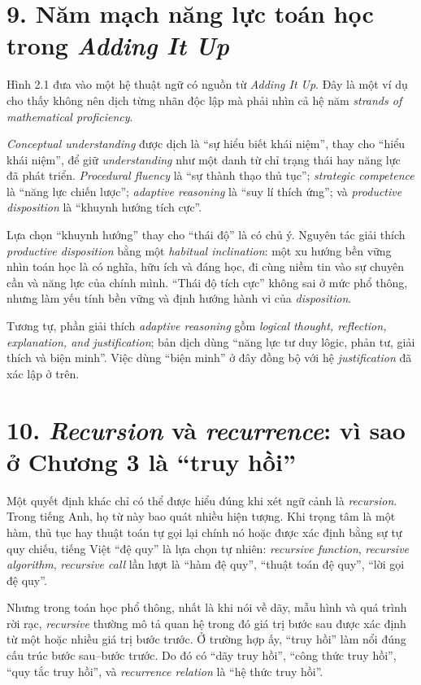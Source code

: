 \section*{9. Năm mạch năng lực toán học trong \emph{Adding It Up}}

Hình 2.1 đưa vào một hệ thuật ngữ có nguồn từ \emph{Adding It Up}. Đây là một ví dụ cho thấy không nên dịch từng nhãn độc lập mà phải nhìn cả hệ năm \emph{strands of mathematical proficiency}.

\emph{Conceptual understanding} được dịch là ``sự hiểu biết khái niệm'', thay cho ``hiểu khái niệm'', để giữ \emph{understanding} như một danh từ chỉ trạng thái hay năng lực đã phát triển. \emph{Procedural fluency} là ``sự thành thạo thủ tục''; \emph{strategic competence} là ``năng lực chiến lược''; \emph{adaptive reasoning} là ``suy lí thích ứng''; và \emph{productive disposition} là ``khuynh hướng tích cực''.

Lựa chọn ``khuynh hướng'' thay cho ``thái độ'' là có chủ ý. Nguyên tác giải thích \emph{productive disposition} bằng một \emph{habitual inclination}: một xu hướng bền vững nhìn toán học là có nghĩa, hữu ích và đáng học, đi cùng niềm tin vào sự chuyên cần và năng lực của chính mình. ``Thái độ tích cực'' không sai ở mức phổ thông, nhưng làm yếu tính bền vững và định hướng hành vi của \emph{disposition}.

Tương tự, phần giải thích \emph{adaptive reasoning} gồm \emph{logical thought, reflection, explanation, and justification}; bản dịch dùng ``năng lực tư duy lôgic, phản tư, giải thích và biện minh''. Việc dùng ``biện minh'' ở đây đồng bộ với hệ \emph{justification} đã xác lập ở trên.

\section*{10. \emph{Recursion} và \emph{recurrence}: vì sao ở Chương 3 là ``truy hồi''}

Một quyết định khác chỉ có thể được hiểu đúng khi xét ngữ cảnh là \emph{recursion}. Trong tiếng Anh, họ từ này bao quát nhiều hiện tượng. Khi trọng tâm là một hàm, thủ tục hay thuật toán tự gọi lại chính nó hoặc được xác định bằng sự tự quy chiếu, tiếng Việt ``đệ quy'' là lựa chọn tự nhiên: \emph{recursive function}, \emph{recursive algorithm}, \emph{recursive call} lần lượt là ``hàm đệ quy'', ``thuật toán đệ quy'', ``lời gọi đệ quy''.

Nhưng trong toán học phổ thông, nhất là khi nói về dãy, mẫu hình và quá trình rời rạc, \emph{recursive} thường mô tả quan hệ trong đó giá trị bước sau được xác định từ một hoặc nhiều giá trị bước trước. Ở trường hợp ấy, ``truy hồi'' làm nổi đúng cấu trúc bước sau--bước trước. Do đó có ``dãy truy hồi'', ``công thức truy hồi'', ``quy tắc truy hồi'', và \emph{recurrence relation} là ``hệ thức truy hồi''.

